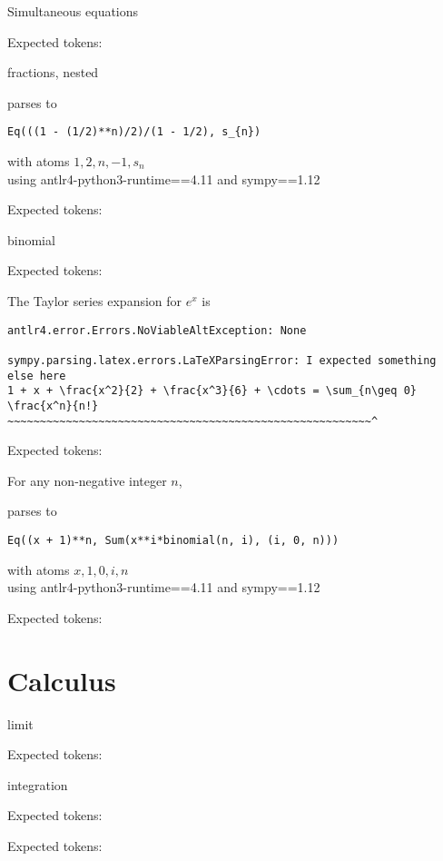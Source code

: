\documentclass{article}
\begin{document}
Simultaneous equations

Expected tokens: 

\hrulefill

fractions, nested

parses to
\begin{verbatim}
Eq(((1 - (1/2)**n)/2)/(1 - 1/2), s_{n})
\end{verbatim}
with atoms ${1, 2, n, -1, s_{n}}$\\
using antlr4-python3-runtime==4.11 and sympy==1.12

Expected tokens: 

\hrulefill

binomial

Expected tokens: 

\hrulefill

The Taylor series expansion for $e^x$ is 

\begin{verbatim}
antlr4.error.Errors.NoViableAltException: None

sympy.parsing.latex.errors.LaTeXParsingError: I expected something else here
1 + x + \frac{x^2}{2} + \frac{x^3}{6} + \cdots = \sum_{n\geq 0} \frac{x^n}{n!}
~~~~~~~~~~~~~~~~~~~~~~~~~~~~~~~~~~~~~~~~~~~~~~~~~~~~~~~~^
\end{verbatim}

Expected tokens: 

\hrulefill


For any non-negative integer $n$,

parses to
\begin{verbatim}
Eq((x + 1)**n, Sum(x**i*binomial(n, i), (i, 0, n)))
\end{verbatim}
with atoms ${x, 1, 0, i, n}$\\
using antlr4-python3-runtime==4.11 and sympy==1.12



Expected tokens: 

\hrulefill


\section{Calculus}
limit

Expected tokens: 

\hrulefill


integration

Expected tokens: 

\hrulefill



Expected tokens: 
\end{document}
